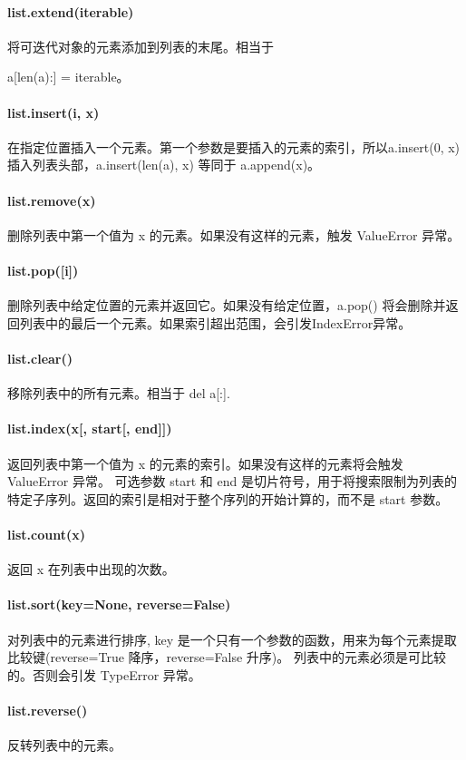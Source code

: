 \documentclass[a4paper, 12pt]{article}
\begin{document}
            \paragraph{list.extend(iterable)} 将可迭代对象的元素添加到列表的末尾。相当于\par
            a[len(a):] = iterable。
            \paragraph{list.insert(i, x)} 在指定位置插入一个元素。第一个参数是要插入的元素的索引，所以a.insert(0, x) 插入列表头部，a.insert(len(a), x) 等同于 a.append(x)。
            \paragraph{list.remove(x)} 删除列表中第一个值为 x 的元素。如果没有这样的元素，触发 ValueError 异常。
            \paragraph{list.pop([i])} 删除列表中给定位置的元素并返回它。如果没有给定位置，a.pop() 将会删除并返回列表中的最后一个元素。如果索引超出范围，会引发IndexError异常。
            \paragraph{list.clear()} 移除列表中的所有元素。相当于 del a[:].
            \paragraph{list.index(x[, start[, end]])} 返回列表中第一个值为 x 的元素的索引。如果没有这样的元素将会触发 ValueError 异常。
            可选参数 start 和 end 是切片符号，用于将搜索限制为列表的特定子序列。返回的索引是相对于整个序列的开始计算的，而不是 start 参数。
            \paragraph{list.count(x)} 返回 x 在列表中出现的次数。
            \paragraph{list.sort(key=None, reverse=False)} 对列表中的元素进行排序, key 是一个只有一个参数的函数，用来为每个元素提取比较键(reverse=True 降序，reverse=False 升序)。
            列表中的元素必须是可比较的。否则会引发 TypeError 异常。
            \paragraph{list.reverse()} 反转列表中的元素。
\end{document}
